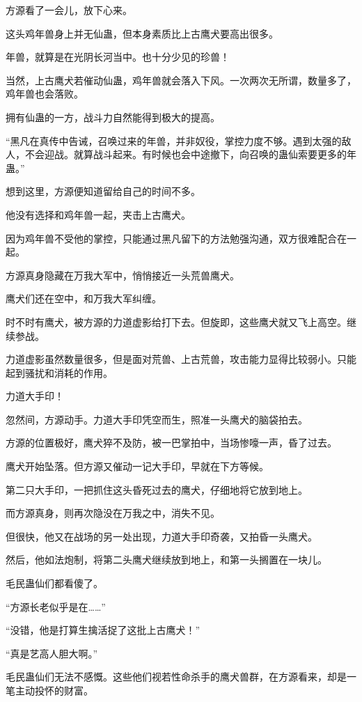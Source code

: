 \begin{this_body}
方源看了一会儿，放下心来。

这头鸡年兽身上并无仙蛊，但本身素质比上古鹰犬要高出很多。

年兽，就算是在光阴长河当中。也十分少见的珍兽！

当然，上古鹰犬若催动仙蛊，鸡年兽就会落入下风。一次两次无所谓，数量多了，鸡年兽也会落败。

拥有仙蛊的一方，战斗力自然能得到极大的提高。

“黑凡在真传中告诫，召唤过来的年兽，并非奴役，掌控力度不够。遇到太强的敌人，不会迎战。就算战斗起来。有时候也会中途撤下，向召唤的蛊仙索要更多的年蛊。”

想到这里，方源便知道留给自己的时间不多。

他没有选择和鸡年兽一起，夹击上古鹰犬。

因为鸡年兽不受他的掌控，只能通过黑凡留下的方法勉强沟通，双方很难配合在一起。

方源真身隐藏在万我大军中，悄悄接近一头荒兽鹰犬。

鹰犬们还在空中，和万我大军纠缠。

时不时有鹰犬，被方源的力道虚影给打下去。但旋即，这些鹰犬就又飞上高空。继续参战。

力道虚影虽然数量很多，但是面对荒兽、上古荒兽，攻击能力显得比较弱小。只能起到骚扰和消耗的作用。

力道大手印！

忽然间，方源动手。力道大手印凭空而生，照准一头鹰犬的脑袋拍去。

方源的位置极好，鹰犬猝不及防，被一巴掌拍中，当场惨嚎一声，昏了过去。

鹰犬开始坠落。但方源又催动一记大手印，早就在下方等候。

第二只大手印，一把抓住这头昏死过去的鹰犬，仔细地将它放到地上。

而方源真身，则再次隐没在万我之中，消失不见。

但很快，他又在战场的另一处出现，力道大手印奇袭，又拍昏一头鹰犬。

然后，他如法炮制，将第二头鹰犬继续放到地上，和第一头搁置在一块儿。

毛民蛊仙们都看傻了。

“方源长老似乎是在……”

“没错，他是打算生擒活捉了这批上古鹰犬！”

“真是艺高人胆大啊。”

毛民蛊仙们无法不感慨。这些他们视若性命杀手的鹰犬兽群，在方源看来，却是一笔主动投怀的财富。


\end{this_body}
